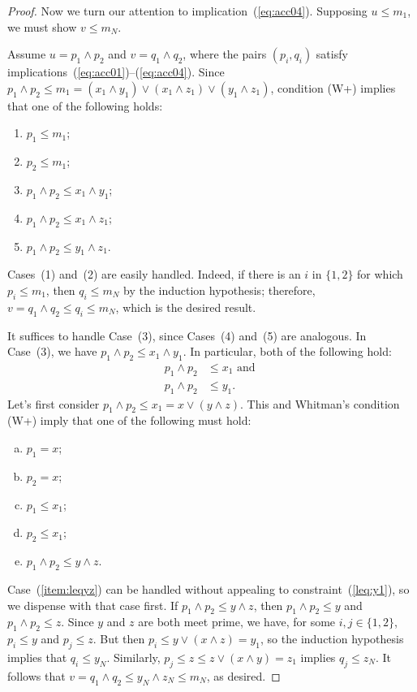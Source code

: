 \begin{proof}
Now we turn our attention to implication~(\ref{eq:acc04}).  
Supposing $u \leq m_1$, we must show $v \leq m_N$.

Assume $u  = p_1 \wedge p_2$ and $v = q_1 \wedge q_2$,
where the pairs $(p_i, q_i)$ satisfy
implications~(\ref{eq:acc01})--(\ref{eq:acc04}).
Since $p_1\wedge p_2 \leq m_1 
  = (x_1 \wedge y_1) \vee (x_1 \wedge z_1) \vee (y_1 \wedge z_1)$, 
condition (W+) implies that one of the following holds:
  \begin{enumerate}
    \item   $p_1\leq m_1$;  
    \item   $p_2 \leq m_1$;  
    \item   $p_1\wedge p_2 \leq x_1 \wedge y_1$;  
    \item   $p_1\wedge p_2 \leq x_1 \wedge z_1$;  
    \item   $p_1\wedge p_2 \leq y_1 \wedge z_1$.  
  \end{enumerate}
  Cases~(1) and~(2) are easily handled. Indeed, if there is an $i$ in 
  $\{1, 2\}$ for which $p_i \leq m_1$, then $q_i \leq m_N$ by the induction hypothesis; therefore, 
  $v = q_1 \wedge q_2 \leq q_i \leq m_N$, which is the desired result.

  It suffices to handle Case~(3), since Cases~(4) and~(5) are analogous.
  In Case~(3), we have $p_1\wedge p_2 \leq x_1 \wedge y_1$. In particular, 
  both of the following hold:
  \begin{align}
  p_1\wedge p_2 &\leq x_1 \text{ and }\label{leq:x1}\\
  p_1\wedge p_2 &\leq y_1. \label{leq:y1}
  \end{align}
  Let's first consider $p_1\wedge p_2 \leq x_1 = x \vee (y \wedge z)$.
  This and Whitman's condition (W+) imply that one of the following must hold:
  \begin{enumerate}[(a)]
    \item \label{item:p1genx}  $p_1= x$;
    \item \label{item:p2genx}  $p_2= x$;
    \item \label{item:p1leqx1}  $p_1\leq x_1$;
    \item \label{item:p2leqx1}  $p_2 \leq x_1$;
    \item \label{item:leqyz}  $p_1\wedge p_2 \leq y \wedge z$.
  \end{enumerate}
  Case~(\ref{item:leqyz}) can be handled without appealing to
  constraint~(\ref{leq:y1}), so we dispense with that case first.
  If $p_1\wedge p_2 \leq y \wedge z$, then $p_1 \wedge p_2 \leq y$ and 
  $p_1 \wedge p_2 \leq z$.  Since $y$ and $z$ are both meet prime,
  we have, for some $i, j \in \{1,2\}$, $p_i \leq y$ and $p_j\leq z$.
  But then $p_i \leq y \vee (x\wedge z) = y_1$, so the induction hypothesis
  implies that $q_i\leq y_N$.  Similarly, 
  $p_j\leq z \leq z \vee (x \wedge y) = z_1$ implies $q_j\leq z_N$.  It follows
  that $v = q_1 \wedge q_2 \leq y_N \wedge z_N \leq m_N$, as desired.
   

\end{proof}
